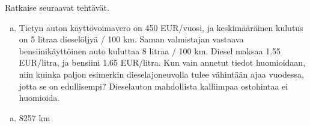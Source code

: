 \begin{tehtava}
    Ratkaise seuraavat tehtävät.
    \begin{enumerate}[a)]
        \item Tietyn auton käyttövoimavero on 450 EUR/vuosi, ja keskimääräinen kulutus on 5 litraa dieselöljyä / 100 km. Saman valmistajan vastaava bensiinikäyttöinen auto kuluttaa 8 litraa / 100 km. Diesel maksaa 1.55 EUR/litra, ja bensiini 1.65 EUR/litra. Kun vain annetut tiedot huomioidaan, niin kuinka paljon esimerkin dieselajoneuvolla tulee vähintään ajaa vuodessa, jotta se on edullisempi? Dieselauton mahdollista kalliimpaa ostohintaa ei huomioida.
    \end{enumerate}

    \begin{vastaus}
        \begin{enumerate}[a)]
            \item 8257 km
        \end{enumerate}
    \end{vastaus}
\end{tehtava}